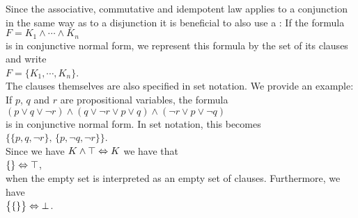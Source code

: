 Since the associative, commutative and idempotent law applies to a conjunction in the same way as to a
disjunction it is beneficial to also use a
:  If the formula
\\[0.2cm]
\hspace*{1.3cm}
$F = K_1 \wedge \cdots \wedge K_n$
\\[0.2cm]
is in conjunctive normal form, we represent this formula
by the set of its clauses and write \\[0.2cm]
\hspace*{1.3cm} 
$F = \{ K_1, \cdots, K_n \}$. 
\\[0.2cm]
The clauses themselves are also specified in set notation.
We provide an example: If $p$, $q$ and $r$ are propositional variables, the formula 
\\[0.2cm]
\hspace*{1.3cm}
$(p \vee q \vee \neg r) \wedge (q \vee \neg r \vee p \vee q)\wedge (\neg r \vee p \vee \neg q)$
\\[0.2cm]
is in conjunctive normal form.  In set notation, this becomes
\\[0.2cm]
\hspace*{1.3cm}
$\bigl\{ \{p, q, \neg r \},\, \{ p, \neg q, \neg r \} \bigr\}$.
\\[0.2cm]
Since we have $K \wedge \top \Leftrightarrow K$ we have that
\\[0.2cm]
\hspace*{1.3cm}
$\{\} \Leftrightarrow \top$,
\\[0.2cm]
when the empty set is interpreted as an empty set of clauses.  Furthermore, we have
\\[0.2cm]
\hspace*{1.3cm}
$\bigl\{ \{\} \bigr\} \Leftrightarrow \bot$.

